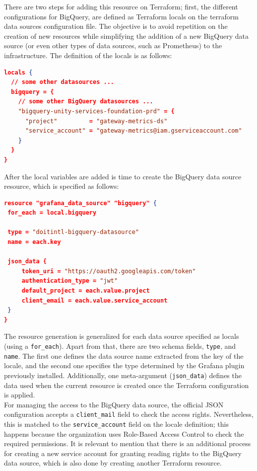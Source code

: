 \documentclass[english, 12pt, a4paper, sci, utf8, a-1b, online]{aaltothesis}
\begin{document}
There are two steps for adding this resource on Terraform; first, the different configurations for BigQuery, are defined as Terraform locals on the terraform data sources configuration file. The objective is to avoid repetition on the creation of new resources while simplifying the addition of a new BigQuery data source (or even other types of data sources, such as Prometheus) to the infrastructure. The definition of the locals is as follows:\\

\begin{lstlisting}[language=json,firstnumber=1]
locals {
  // some other datasources ...
  bigquery = {
    // some other BigQuery datasources ...
    "bigquery-unity-services-foundation-prd" = {
      "project"         = "gateway-metrics-ds"
      "service_account" = "gateway-metrics@iam.gserviceaccount.com"
    }
  }
}
\end{lstlisting}

After the local variables are added is time to create the BigQuery data source resource, which is specified as follows:\\

\begin{lstlisting}[language=json,firstnumber=1]
resource "grafana_data_source" "bigquery" {
 for_each = local.bigquery
 
 type = "doitintl-bigquery-datasource"
 name = each.key
 
 json_data {
     token_uri = "https://oauth2.googleapis.com/token"
     authentication_type = "jwt"
     default_project = each.value.project
     client_email = each.value.service_account
 }
}
\end{lstlisting}

The resource generation is generalized for each data source specified as locals (using a \texttt{for\_each}). Apart from that, there are two schema fields, \texttt{type}, and \texttt{name}. The first one defines the data source name extracted from the key of the locale, and the second one specifies the type determined by the Grafana plugin previously installed. Additionally, one meta-argument \cite{TerraformMeta} (\texttt{json\_data}) defines the data used when the current resource is created once the Terraform configuration is applied.\\

For managing the access to the BigQuery data source, the official JSON configuration accepts a \texttt{client\_mail} field to check the access rights. Nevertheless, this is matched to the \texttt{service\_account} field on the locale definition; this happens because the organization uses Role-Based Access Control to check the required permissions. It is relevant to mention that there is an additional process for creating a new service account for granting reading rights to the BigQuery data source, which is also done by creating another Terraform resource.
\end{document}
